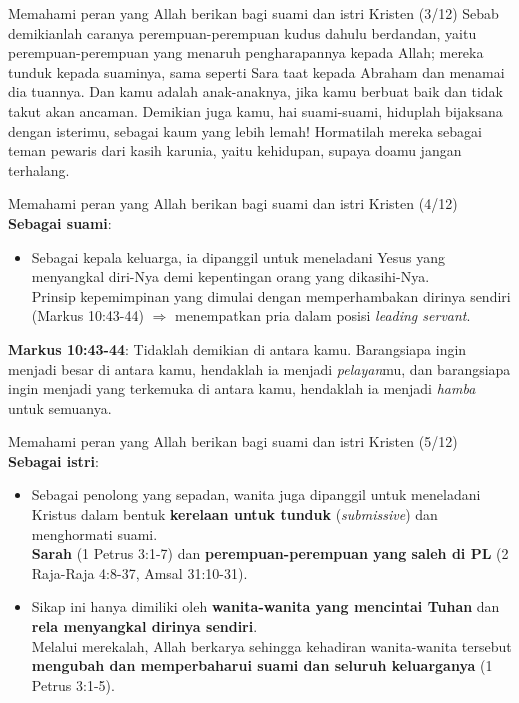 \documentclass{beamer}
\theoremstyle{mystyle}
\begin{document}
\begin{frame}{Memahami peran yang Allah berikan bagi suami dan istri Kristen (3/12)}
Sebab demikianlah caranya perempuan-perempuan kudus dahulu berdandan, yaitu perempuan-perempuan yang menaruh pengharapannya kepada Allah; mereka tunduk kepada suaminya, sama seperti Sara taat kepada Abraham dan menamai dia tuannya. Dan kamu adalah anak-anaknya, jika kamu berbuat baik dan tidak takut akan ancaman. Demikian juga kamu, hai suami-suami, hiduplah bijaksana dengan isterimu, sebagai kaum yang lebih lemah! Hormatilah mereka sebagai teman pewaris dari kasih karunia, yaitu kehidupan, supaya doamu jangan terhalang.  	
\end{frame}

\begin{frame}{Memahami peran yang Allah berikan bagi suami dan istri Kristen (4/12)}
	\textbf{Sebagai suami}:
	\begin{itemize}
		\item Sebagai kepala keluarga, ia dipanggil untuk meneladani Yesus yang menyangkal diri-Nya demi kepentingan orang yang dikasihi-Nya. \\
		Prinsip kepemimpinan yang dimulai dengan memperhambakan dirinya sendiri (Markus 10:43-44) $\Longrightarrow$ menempatkan pria dalam posisi \textit{leading servant}.											
	\end{itemize}

	\bigskip	
	
	\textbf{Markus 10:43-44}: Tidaklah demikian di antara kamu. Barangsiapa ingin menjadi besar di antara kamu, hendaklah ia menjadi \textit{pelayan}mu, dan barangsiapa ingin menjadi yang terkemuka di antara kamu, hendaklah ia menjadi \textit{hamba} untuk semuanya.
\end{frame}

\begin{frame}{Memahami peran yang Allah berikan bagi suami dan istri Kristen (5/12)}
	\textbf{Sebagai istri}:
	\begin{itemize}
		\item Sebagai penolong yang sepadan, wanita juga dipanggil untuk meneladani Kristus dalam bentuk \textbf{kerelaan untuk tunduk} (\textit{submissive}) dan menghormati suami. \\
		\textbf{Sarah} (1 Petrus 3:1-7) dan \textbf{perempuan-perempuan yang saleh di PL} (2 Raja-Raja 4:8-37, Amsal 31:10-31).
		\item Sikap ini hanya dimiliki oleh \textbf{wanita-wanita yang mencintai Tuhan} dan \textbf{rela menyangkal dirinya sendiri}. \\
		Melalui merekalah, Allah berkarya sehingga kehadiran wanita-wanita tersebut \textbf{mengubah dan memperbaharui suami dan seluruh keluarganya} (1 Petrus 3:1-5).		
	\end{itemize}
\end{frame}
\end{document}

